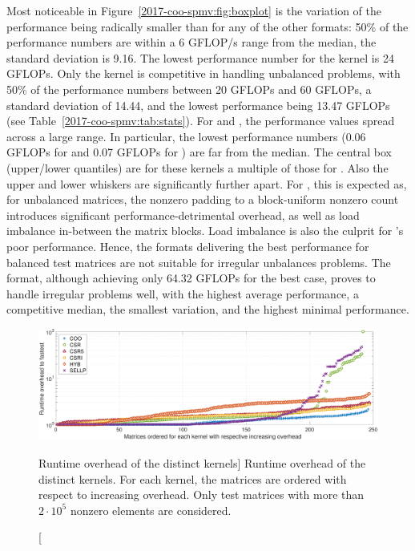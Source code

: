 Most noticeable in Figure~\ref{2017-coo-spmv:fig:boxplot} 
is the variation of the \coo performance being radically smaller than
for any of the other formats: 
50\% of the performance numbers are within a 6 GFLOP/s range from the median,
the standard deviation is 9.16. 
The lowest performance number for the \coo kernel is 24 GFLOPs.
Only the \csri kernel is competitive in handling unbalanced problems,
with 50\% of the performance numbers between 20 GFLOPs and 60 GFLOPs,
a standard deviation of 14.44, and the lowest performance being 13.47 GFLOPs 
(see Table~\ref{2017-coo-spmv:tab:stats}).
For \sellp and \csr, the performance values spread across a large range.
In particular, 
the lowest performance numbers (0.06 GFLOPs for \sellp and 0.07 GFLOPs for \csr) 
are far from the median. 
The central box (upper/lower quantiles)
are for these kernels a multiple of those for \coo. 
Also the upper and lower whiskers are significantly further apart.
For \sellp, this is expected as, for unbalanced matrices, the nonzero padding to a
block-uniform nonzero count introduces significant performance-detrimental
overhead, as well as load imbalance in-between the matrix blocks.
Load imbalance is also the culprit for \csr's poor performance.
Hence, the formats delivering the best performance for balanced test matrices
are not suitable for irregular unbalances problems.
The \coo format, although achieving only 64.32 GFLOPs for the best case,
proves to handle irregular problems well, with the highest average performance,
a competitive median, the smallest
variation, and the highest minimal performance.

\begin{figure}[t]
\begin{center}
\includegraphics[width=\columnwidth]{plots/overhead_log_2e5}
\end{center}
\caption
[Runtime overhead of the distinct \spmv kernels]
{Runtime overhead of the distinct \spmv kernels. For each kernel, the matrices are ordered with respect to increasing overhead. Only test matrices with more than $2\cdot 10^5$ nonzero elements are considered.}
\label{2017-coo-spmv:fig:overhead}
\end{figure}

